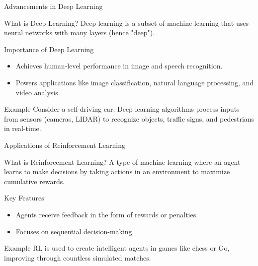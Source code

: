 \documentclass[aspectratio=169]{beamer}
\begin{document}
\begin{frame}[fragile]{Advancements in Deep Learning}
  \begin{block}{What is Deep Learning?}
    Deep learning is a subset of machine learning that uses neural networks with many layers (hence "deep").
  \end{block}

  \begin{block}{Importance of Deep Learning}
    \begin{itemize}
      \item Achieves human-level performance in image and speech recognition.
      \item Powers applications like image classification, natural language processing, and video analysis.
    \end{itemize}
  \end{block}

  \begin{exampleblock}{Example}
    Consider a self-driving car. Deep learning algorithms process inputs from sensors (cameras, LIDAR) to recognize objects, traffic signs, and pedestrians in real-time.
  \end{exampleblock}
\end{frame}

\begin{frame}[fragile]{Applications of Reinforcement Learning}
  \begin{block}{What is Reinforcement Learning?}
    A type of machine learning where an agent learns to make decisions by taking actions in an environment to maximize cumulative rewards.
  \end{block}

  \begin{block}{Key Features}
    \begin{itemize}
      \item Agents receive feedback in the form of rewards or penalties.
      \item Focuses on sequential decision-making.
    \end{itemize}
  \end{block}

  \begin{exampleblock}{Example}
    RL is used to create intelligent agents in games like chess or Go, improving through countless simulated matches.
  \end{exampleblock}
\end{frame}
\end{document}
